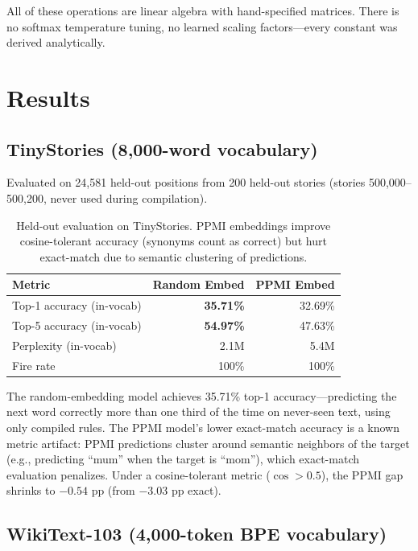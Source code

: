 \documentclass[11pt,a4paper]{article}
\begin{document}
All of these operations are linear algebra with hand-specified matrices. There is no softmax temperature tuning, no learned scaling factors---every constant was derived analytically.

\section{Results}

\subsection{TinyStories (8,000-word vocabulary)}

Evaluated on 24,581 held-out positions from 200 held-out stories (stories 500,000--500,200, never used during compilation).

\begin{table}[h]
\centering
\begin{tabular}{lrr}
\hline
\textbf{Metric} & \textbf{Random Embed} & \textbf{PPMI Embed} \\
\hline
Top-1 accuracy (in-vocab) & \textbf{35.71\%} & 32.69\% \\
Top-5 accuracy (in-vocab) & \textbf{54.97\%} & 47.63\% \\
Perplexity (in-vocab) & 2.1M & 5.4M \\
Fire rate & 100\% & 100\% \\
\hline
\end{tabular}
\caption{Held-out evaluation on TinyStories. PPMI embeddings improve cosine-tolerant accuracy (synonyms count as correct) but hurt exact-match due to semantic clustering of predictions.}
\end{table}

The random-embedding model achieves 35.71\% top-1 accuracy---predicting the next word correctly
more than one third of the time on never-seen text, using only compiled rules. The PPMI model's
lower exact-match accuracy is a known metric artifact: PPMI predictions cluster around semantic
neighbors of the target (e.g., predicting ``mum'' when the target is ``mom''), which exact-match
evaluation penalizes. Under a cosine-tolerant metric ($\cos > 0.5$), the PPMI gap shrinks to
$-0.54$ pp (from $-3.03$ pp exact).

\subsection{WikiText-103 (4,000-token BPE vocabulary)}
\end{document}
